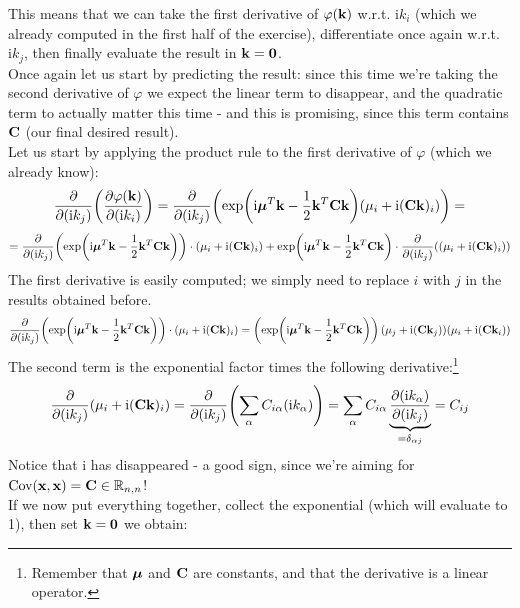 \documentclass[a4paper]{article}
\newcommand{\R}{\mathbb{R}}
\newcommand{\mat}[1]{\vb{#1}}
\let\temp\phi%
\let\phi\varphi
\let\varphi\temp
\renewcommand{\i}{\mathrm{i}} %
\begin{document}
This means that we can take the first derivative of $\phi(\vb{k)}$ w.r.t. $\i k_i$ (which we already computed in the first half of the exercise), differentiate once again w.r.t. $\i k_j$, then finally evaluate the result in $\vb{k} = \vb{0}$.\\ 
Once again let us start by predicting the result: since this time we're taking the second derivative of $\phi$ we expect the linear term to disappear, and the quadratic term to actually matter this time - and this is promising, since this term contains $\mat{C}$ (our final desired result).\\
Let us start by applying the product rule to the first derivative of $\phi$ (which we already know):
\begin{equation*}
    \pdv{(\i k_j)}(\pdv{\phi(\vb{k})}{(\i k_i)}) = \pdv{(\i k_j)}(\exp(\i\vb*{\mu}^T\vb{k} - \frac{1}{2}\vb{k}^T\mat{C}\vb{k})(\mu_i+\i (\mat{C}\vb{k})_i)) =
\end{equation*}
\begin{equation*}
    = \pdv{(\i k_j)}(\exp(\i\vb*{\mu}^T\vb{k} - \frac{1}{2}\vb{k}^T\mat{C}\vb{k}))\cdot(\mu_i+\i (\mat{C}\vb{k})_i) +
    \exp(\i\vb*{\mu}^T\vb{k} - \frac{1}{2}\vb{k}^T\mat{C}\vb{k})\cdot\pdv{(\i k_j)}((\mu_i+\i (\mat{C}\vb{k})_i))
\end{equation*}
The first derivative is easily computed; we simply need to replace $i$ with $j$ in the results obtained before.
\begin{equation*}
    \pdv{(\i k_j)}(\exp(\i\vb*{\mu}^T\vb{k} - \frac{1}{2}\vb{k}^T\mat{C}\vb{k}))\cdot(\mu_i+\i (\mat{C}\vb{k})_i) =
    \left(\exp(\i\vb*{\mu}^T\vb{k} - \frac{1}{2}\vb{k}^T\mat{C}\vb{k})\right)(\mu_j + \i(\mat{C}\vb{k}_j))(\mu_i + \i(\mat{C}\vb{k}_i))
\end{equation*}
The second term is the exponential factor times the following derivative:\footnote{Remember that $\vb*{\mu}$ and $\mat{C}$ are constants, and that the derivative is a linear operator.}
\begin{equation*}
    \pdv{(\i k_j)}(\mu_i + \i (\mat{C}\vb{k})_i) = \pdv{(\i k_j)}(\sum_\alpha C_{i\alpha}(\i k_\alpha)) = \sum_\alpha C_{i\alpha}\underbrace{\pdv{(\i k_\alpha)}{(\i k_j)}}_{= \delta_{\alpha j}} = C_{ij}
\end{equation*}
Notice that $\i$ has disappeared - a good sign, since we're aiming for $\text{Cov}(\vb{x}, \vb{x}) = \mat{C}\in \R_{n,n}$!\\ 
If we now put everything together, collect the exponential (which will evaluate to 1), then set $\vb{k} = \vb{0}$ we obtain:
\end{document}
